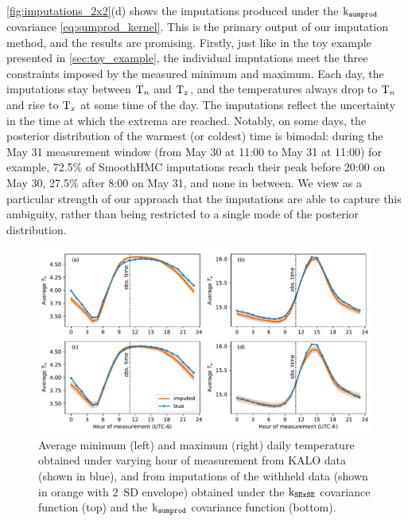 \documentclass[12pt]{article}
\begin{document}
\autoref{fig:imputations_2x2}(d) shows the imputations produced under the \(\operatorname{k_{\mathtt{sumprod}}}\) covariance \autoref{eq:sumprod_kernel}.
This is the primary output of our imputation method, and the results are promising.
Firstly, just like in the toy example presented in \autoref{sec:toy_example}, the individual imputations meet the three constraints imposed by the measured minimum and maximum.
Each day, the imputations stay between \(\mathrm{T}_{n}\) and \(\mathrm{T}_{x}\),
and the temperatures always drop to \(\mathrm{T}_{n}\) and rise to \(\mathrm{T}_{x}\) at some time of the day.
The imputations reflect the uncertainty in the time at which the extrema are reached.
Notably, on some days, the posterior distribution of the warmest (or coldest) time is bimodal:
during the May 31 measurement window (from May 30 at 11:00 to May 31 at 11:00) for example, 72.5\% of SmoothHMC imputations reach their peak before 20:00 on May 30, 27.5\% after 8:00 on May 31, and none in between. 
We view as a particular strength of our approach that the imputations are able to capture this ambiguity, rather than being restricted to a single mode of the posterior distribution.

\begin{figure}[tbp]
\centering
\includegraphics[height=0.35\textheight,width=0.99\textwidth,keepaspectratio]{../figures/imputed_summary_stats.pdf}
\caption{\label{fig:imputed_summary_stats}
Average minimum (left) and maximum (right) daily temperature obtained under varying hour of measurement from KALO data (shown in blue), and from imputations of the withheld data (shown in orange with 2~SD envelope) obtained under the \(\operatorname{k_{\mathtt{SExSE}}}\) covariance function (top) and the \(\operatorname{k_{\mathtt{sumprod}}}\) covariance function (bottom).}
\end{figure}
    
\end{document}
